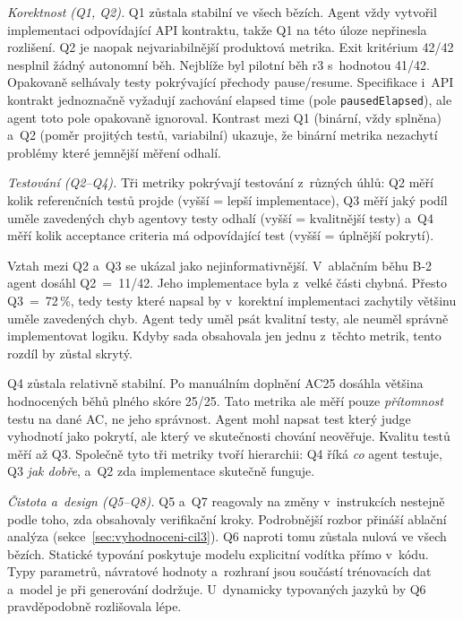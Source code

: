 \textit{Korektnost (Q1, Q2).}
\acs{Q1} zůstala stabilní ve všech bězích. Agent vždy vytvořil
implementaci odpovídající API kontraktu, takže \acs{Q1} na této úloze
nepřinesla rozlišení. \ac{Q2} je naopak nejvariabilnější produktová
metrika. Exit kritérium 42/42 nesplnil žádný autonomní běh. Nejblíže
byl pilotní běh r3 s~hodnotou 41/42. Opakovaně selhávaly testy
pokrývající přechody pause/resume. Specifikace i~API kontrakt
jednoznačně vyžadují zachování elapsed time (pole
\texttt{pausedElapsed}), ale agent toto pole opakovaně ignoroval.
Kontrast mezi \acs{Q1} (binární, vždy splněna) a~\acs{Q2} (poměr
projitých testů, variabilní) ukazuje, že binární metrika nezachytí
problémy které jemnější měření odhalí.

\textit{Testování (Q2--Q4).}
Tři metriky pokrývají testování z~různých úhlů: \ac{Q2} měří
kolik referenčních testů projde (vyšší = lepší implementace),
\ac{Q3} měří jaký podíl uměle zavedených chyb agentovy testy odhalí
(vyšší = kvalitnější testy) a~\ac{Q4} měří kolik acceptance
criteria má odpovídající test (vyšší = úplnější pokrytí).

Vztah mezi \acs{Q2} a~\acs{Q3} se ukázal jako nejinformativnější.
V~ablačním běhu B-2 agent dosáhl \acs{Q2}~=~11/42. Jeho
implementace byla z~velké části chybná. Přesto
\acs{Q3}~=~72\,\%, tedy testy které napsal by v~korektní
implementaci zachytily většinu uměle zavedených chyb. Agent tedy uměl
psát kvalitní testy, ale neuměl správně implementovat logiku.
Kdyby sada obsahovala jen jednu z~těchto metrik, tento rozdíl by
zůstal skrytý.

\acs{Q4} zůstala relativně stabilní. Po manuálním doplnění AC25
dosáhla většina hodnocených běhů plného skóre 25/25. Tato metrika ale měří
pouze \textit{přítomnost}
testu na dané AC, ne jeho správnost. Agent mohl napsat test
který judge vyhodnotí jako pokrytí, ale který ve skutečnosti
chování neověřuje. Kvalitu testů měří až \acs{Q3}. Společně tyto
tři metriky tvoří hierarchii: \acs{Q4} říká \textit{co} agent
testuje, \acs{Q3} \textit{jak dobře}, a~\acs{Q2} zda implementace
skutečně funguje.

\textit{Čistota a~design (Q5--Q8).}
\ac{Q5} a~\ac{Q7} reagovaly na změny v~instrukcích nestejně podle toho,
zda obsahovaly verifikační kroky. Podrobnější rozbor přináší ablační
analýza (sekce~\ref{sec:vyhodnoceni-cil3}). \ac{Q6} naproti tomu
zůstala nulová ve všech bězích.
Statické typování poskytuje modelu explicitní vodítka přímo
v~kódu. Typy parametrů, návratové hodnoty a~rozhraní jsou
součástí trénovacích dat a~model je při generování dodržuje.
U~dynamicky typovaných jazyků by \acs{Q6} pravděpodobně
rozlišovala lépe.

